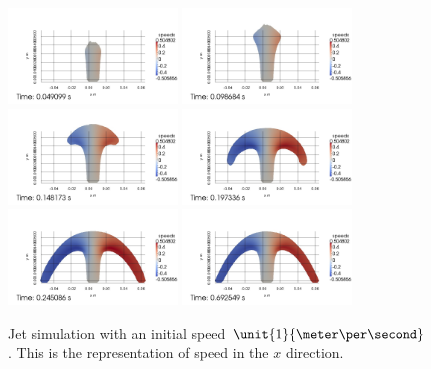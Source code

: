 \begin{figure}
\begin{center}
\subcaptionbox{\label{top:jet:Px:1}}
{
\includegraphics[width=0.4\textwidth]{topology/JetPetit/speedx0000.jpg}
}
\subcaptionbox{\label{top:jet:Px:2}}
{
\includegraphics[width=0.4\textwidth]{topology/JetPetit/speedx0001.jpg}
}
\subcaptionbox{\label{top:jet:Px:3}}
{
\includegraphics[width=0.4\textwidth]{topology/JetPetit/speedx0002.jpg}
}
\subcaptionbox{\label{top:jet:Px:4}}
{
\includegraphics[width=0.4\textwidth]{topology/JetPetit/speedx0003.jpg}
}
\subcaptionbox{\label{top:jet:Px:5}}
{
\includegraphics[width=0.4\textwidth]{topology/JetPetit/speedx0004.jpg}
}
\subcaptionbox{\label{top:jet:Px:6}}
{
\includegraphics[width=0.4\textwidth]{topology/JetPetit/speedx0005.jpg}
}
\end{center}
\caption{Jet simulation with an initial speed $\unit{1}{\meter \per \second}$.
This is the representation of speed in the $x$ direction.}
\label{top:jet:Px}
\end{figure}

